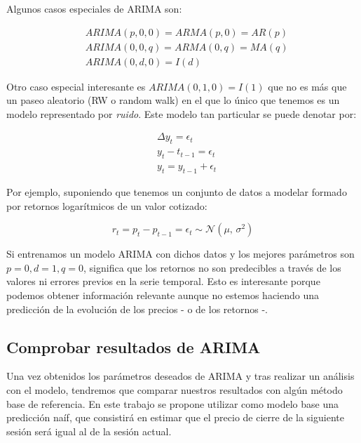 Algunos casos especiales de ARIMA son:

\begin{align*}
	&ARIMA(p, 0, 0) = ARMA(p, 0) = AR(p) \\
	&ARIMA(0, 0, q) = ARMA(0, q) = MA(q) \\
	&ARIMA(0, d, 0) = I(d)
\end{align*}

Otro caso especial interesante es $ARIMA(0, 1, 0) = I(1)$ que no es más que un paseo aleatorio (RW o random walk)\citep{wiki:paseo_aleatorio} en el que lo único que tenemos es un modelo representado por \emph{ruido}. Este modelo tan particular se puede denotar por:

\begin{equation}
\begin{aligned}
	&\Delta y_{t} = \epsilon_{t} \\
	&y_{t} - t_{t-1} = \epsilon_{t} \\
	&y_{t} = y_{t-1} + \epsilon_{t}
\end{aligned}
\end{equation}

Por ejemplo, suponiendo que tenemos un conjunto de datos a modelar formado por retornos logarítmicos de un valor cotizado: 

\begin{equation}
	r_{t} = p_{t} - p_{t-1} = \epsilon_{t} \sim \mathcal{N}(\mu,\,\sigma^{2})
\end{equation}

Si entrenamos un modelo ARIMA con dichos datos y los mejores parámetros son $p=0, d=1, q=0$, significa que los retornos no son predecibles a través de los valores ni errores previos en la serie temporal. Esto es interesante porque podemos obtener información relevante aunque no estemos haciendo una predicción de la evolución de los precios - o de los retornos -. 


\subsection{Comprobar resultados de ARIMA}

Una vez obtenidos los parámetros deseados de ARIMA y tras realizar un análisis con el modelo, tendremos que comparar nuestros resultados con algún método base de referencia. En este trabajo se propone utilizar como modelo base una predicción naíf, que consistirá en estimar que el precio de cierre de la siguiente sesión será igual al de la sesión actual. 

